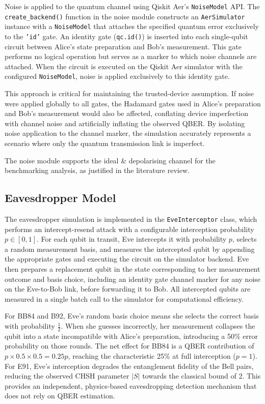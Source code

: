 Noise is applied to the quantum channel using Qiskit Aer's \texttt{NoiseModel} API. The \texttt{create\_backend()} function in the noise module constructs an \texttt{AerSimulator} instance with a \texttt{NoiseModel} that attaches the specified quantum error exclusively to the \texttt{'id'} gate. An identity gate (\texttt{qc.id()}) is inserted into each single-qubit circuit between Alice's state preparation and Bob's measurement. This gate performs no logical operation but serves as a marker to which noise channels are attached. When the circuit is executed on the Qiskit Aer simulator with the configured \texttt{NoiseModel}, noise is applied exclusively to this identity gate.

This approach is critical for maintaining the trusted-device assumption. If noise were applied globally to all gates, the Hadamard gates used in Alice's preparation and Bob's measurement would also be affected, conflating device imperfection with channel noise and artificially inflating the observed QBER. By isolating noise application to the channel marker, the simulation accurately represents a scenario where only the quantum transmission link is imperfect.

The noise module supports the ideal \& depolarising channel for the benchmarking analysis, as justified in the literature review.

\subsection{Eavesdropper Model}

The eavesdropper simulation is implemented in the \texttt{EveInterceptor} class, which performs an intercept-resend attack with a configurable interception probability $p \in [0, 1]$. For each qubit in transit, Eve intercepts it with probability $p$, selects a random measurement basis, and measures the intercepted qubit by appending the appropriate gates and executing the circuit on the simulator backend. Eve then prepares a replacement qubit in the state corresponding to her measurement outcome and basis choice, including an identity gate channel marker for any noise on the Eve-to-Bob link, before forwarding it to Bob. All intercepted qubits are measured in a single batch call to the simulator for computational efficiency.

For BB84 and B92, Eve's random basis choice means she selects the correct basis with probability $\frac{1}{2}$. When she guesses incorrectly, her measurement collapses the qubit into a state incompatible with Alice's preparation, introducing a 50\% error probability on those rounds. The net effect for BB84 is a QBER contribution of $p \times 0.5 \times 0.5 = 0.25p$, reaching the characteristic 25\% at full interception ($p = 1$). For E91, Eve's interception degrades the entanglement fidelity of the Bell pairs, reducing the observed CHSH parameter $|S|$ towards the classical bound of 2. This provides an independent, physics-based eavesdropping detection mechanism that does not rely on QBER estimation.

